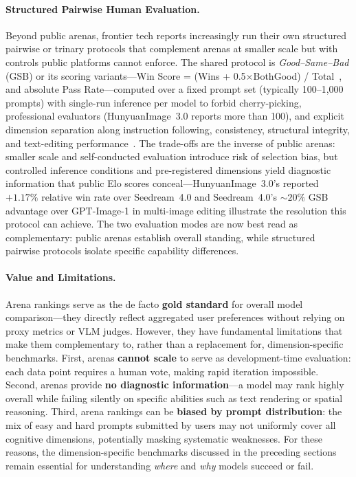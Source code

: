 \documentclass{llmxive}
\begin{document}
\paragraph{Structured Pairwise Human Evaluation.} Beyond public arenas, frontier tech reports increasingly run their own structured pairwise or trinary protocols that complement arenas at smaller scale but with controls public platforms cannot enforce. The shared protocol is \emph{Good--Same--Bad} (GSB) or its scoring variants---Win Score = (Wins + 0.5$\times$BothGood) / Total~\citep{mao2026wan}, and absolute Pass Rate---computed over a fixed prompt set (typically 100--1{,}000 prompts) with single-run inference per model to forbid cherry-picking, professional evaluators (HunyuanImage~3.0 reports more than 100), and explicit dimension separation along instruction following, consistency, structural integrity, and text-editing performance~\citep{cao2025hunyuanimage, seedream2025seedream, team2025longcat, team2026firered, mao2026wan}. The trade-offs are the inverse of public arenas: smaller scale and self-conducted evaluation introduce risk of selection bias, but controlled inference conditions and pre-registered dimensions yield diagnostic information that public Elo scores conceal---HunyuanImage~3.0's reported $+1.17\%$ relative win rate over Seedream~4.0 and Seedream~4.0's $\sim$$20\%$ GSB advantage over GPT-Image-1 in multi-image editing illustrate the resolution this protocol can achieve. The two evaluation modes are now best read as complementary: public arenas establish overall standing, while structured pairwise protocols isolate specific capability differences.

\paragraph{Value and Limitations.} Arena rankings serve as the de facto \textbf{gold standard} for overall model comparison---they directly reflect aggregated user preferences without relying on proxy metrics or VLM judges. However, they have fundamental limitations that make them complementary to, rather than a replacement for, dimension-specific benchmarks. First, arenas \textbf{cannot scale} to serve as development-time evaluation: each data point requires a human vote, making rapid iteration impossible. Second, arenas provide \textbf{no diagnostic information}---a model may rank highly overall while failing silently on specific abilities such as text rendering or spatial reasoning. Third, arena rankings can be \textbf{biased by prompt distribution}: the mix of easy and hard prompts submitted by users may not uniformly cover all cognitive dimensions, potentially masking systematic weaknesses. For these reasons, the dimension-specific benchmarks discussed in the preceding sections remain essential for understanding \emph{where} and \emph{why} models succeed or fail.
\end{document}
